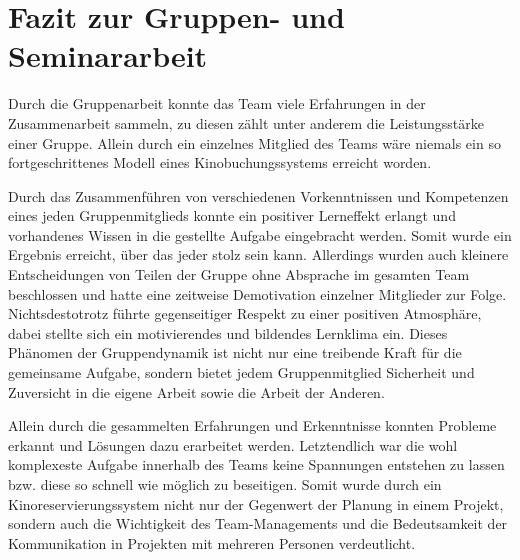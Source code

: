 \section{Fazit zur Gruppen- und Seminararbeit}
\multipleauthorsection{\authorRF}{\authorEJ}

Durch die Gruppenarbeit konnte das Team viele Erfahrungen in der Zusammenarbeit sammeln, zu diesen zählt unter anderem die Leistungsstärke einer Gruppe.
Allein durch ein einzelnes Mitglied des Teams wäre niemals ein so fortgeschrittenes Modell eines Kinobuchungssystems erreicht worden.

Durch das Zusammenführen von verschiedenen Vorkenntnissen und Kompetenzen eines jeden Gruppenmitglieds konnte ein positiver Lerneffekt erlangt und vorhandenes Wissen in die gestellte Aufgabe eingebracht werden.
Somit wurde ein Ergebnis erreicht, über das jeder stolz sein kann.
Allerdings wurden auch kleinere Entscheidungen von Teilen der Gruppe ohne Absprache im gesamten Team beschlossen und hatte eine zeitweise Demotivation einzelner Mitglieder zur Folge.
Nichtsdestotrotz führte gegenseitiger Respekt zu einer positiven Atmosphäre, dabei stellte sich ein motivierendes und bildendes Lernklima ein.
Dieses Phänomen der Gruppendynamik ist nicht nur eine treibende Kraft für die gemeinsame Aufgabe, sondern bietet jedem Gruppenmitglied Sicherheit und Zuversicht in die eigene Arbeit sowie die Arbeit der Anderen.

Allein durch die gesammelten Erfahrungen und Erkenntnisse konnten Probleme erkannt und Lösungen dazu erarbeitet werden.
Letztendlich war die wohl komplexeste Aufgabe innerhalb des Teams keine Spannungen entstehen zu lassen bzw. diese so schnell wie möglich zu beseitigen.
Somit wurde durch ein Kinoreservierungssystem nicht nur der Gegenwert der Planung in einem Projekt, sondern auch die Wichtigkeit des Team-Managements und die Bedeutsamkeit der Kommunikation in Projekten mit mehreren Personen verdeutlicht.
